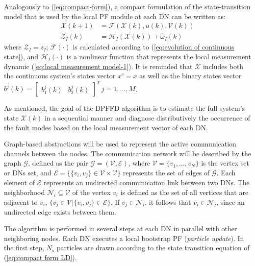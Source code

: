 \documentclass[10pt,twocolumn,twoside]{IEEEtran}
\begin{document}
Analogously to (\ref{eq:compact-form}), a compact formulation of
the state-transition model that is used by the local PF module at each
DN can be written as: 
\begin{equation}
\begin{aligned}\mathcal{X}(k+1) & =\mathcal{F}(\mathcal{X}(k),u(k),\mathcal{V}(k))\\
\mathcal{Z}_{I}(k) & =\mathcal{H}_{I}(\mathcal{X}(k))+\hat{\omega}_{I}(k)
\end{aligned}
\label{eq:compact form LD}
\end{equation}
\noindent where $\mathcal{Z}_{I}=z_{I}$; $\mathcal{F}(\cdot)$ is
calculated according to (\ref{eq:evolution of continuous state}),
and $\mathcal{H}_{I}(\cdot)$ is a nonlinear function that represents
the local measurement dynamic (\ref{eq:local measurement model-1}).
It is reminded that $\mathcal{X}$ includes both the continuous system's
states vector $x^{c} = x$ as well as the binary states vector
$b ^{j}\left(k\right)=[\begin{array}{cc}
b_{1} ^{j}\left(k\right) & b_{2} ^{j}\left(k\right)\end{array}]^{T}\: j=1,\ldots,M$. 

As mentioned, the goal of the DPFFD algorithm is to estimate the full
system's state $\mathcal{X}(k)$ in a sequential manner and diagnose
distributively the occurrence of the fault modes based on the local
measurement vector of each DN. 

Graph-based abstractions will be used to represent the active communication channels between the nodes. The communication network will be described by the graph $\mathcal{G}$, defined as the pair $\mathcal{G=}(\mathcal{V},\mathcal{E})$, where $\mathcal{V}=\{v_{1},\ldots,v_{N}\}$ is the vertex set or DNs set, and $\mathcal{E}=\{\{v_{i},v_{j}\}\in\mathcal{V}\times\mathcal{V}\}$ represents the set of edges of $\mathcal{G}$. Each element of $\mathcal{E}$ represents an undirected communication link between two DNs. The neighborhood $\mathcal{N}_{i}\subseteq\mathcal{V}$ of the vertex $v_{i}$ is defined as the set of all vertices that are adjacent to $v_{i}$, $\{v_{j}\in\mathcal{V}|\{v_{i},v_{j}\}\in\mathcal{E}\}$. If $v_{j}\in\mathcal{N}_{i}$, it follows that $v_{i}\in\mathcal{N}_{j}$, since an undirected edge exists between them.

The algorithm is performed in several steps at each DN in parallel
with other neighboring nodes. Each DN executes a local bootstrap PF
(\emph{particle update}). In the first step, $N_{s}$ particles are
drawn according to the state transition equation of (\ref{eq:compact form LD}). 
\end{document}
